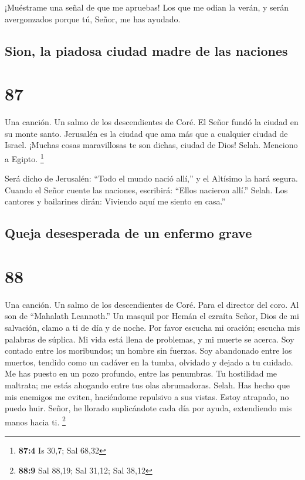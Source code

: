  ¡Muéstrame una señal de que me apruebas! Los que me odian
la verán, y serán avergonzados porque tú, Señor, me has ayudado.

\hypertarget{sion-la-piadosa-ciudad-madre-de-las-naciones}{%
\subsection{Sion, la piadosa ciudad madre de las
naciones}\label{sion-la-piadosa-ciudad-madre-de-las-naciones}}

\hypertarget{section-86}{%
\section{87}\label{section-86}}

Una canción. Un salmo de los descendientes de Coré.  El
Señor fundó la ciudad en su monte santo.  Jerusalén es la
ciudad que ama más que a cualquier ciudad de Israel. 
¡Muchas cosas maravillosas te son dichas, ciudad de Dios! Selah.
 Menciono a Egipto. \footnote{\textbf{87:4} Is 30,7; Sal
  68,32}

 Será dicho de Jerusalén: ``Todo el mundo nació allí,'' y el
Altísimo la hará segura.  Cuando el Señor cuente las
naciones, escribirá: ``Ellos nacieron allí.'' Selah.  Los
cantores y bailarines dirán: Viviendo aquí me siento en casa.''

\hypertarget{queja-desesperada-de-un-enfermo-grave}{%
\subsection{Queja desesperada de un enfermo
grave}\label{queja-desesperada-de-un-enfermo-grave}}

\hypertarget{section-87}{%
\section{88}\label{section-87}}

Una canción. Un salmo de los descendientes de Coré. Para el director del
coro. Al son de ``Mahalath Leannoth.'' Un masquil por Hemán el ezraíta
 Señor, Dios de mi salvación, clamo a ti de día y de noche.
 Por favor escucha mi oración; escucha mis palabras de
súplica.  Mi vida está llena de problemas, y mi muerte se
acerca.  Soy contado entre los moribundos; un hombre sin
fuerzas.  Soy abandonado entre los muertos, tendido como un
cadáver en la tumba, olvidado y dejado a tu cuidado.  Me has
puesto en un pozo profundo, entre las penumbras.  Tu
hostilidad me maltrata; me estás ahogando entre tus olas abrumadoras.
Selah.  Has hecho que mis enemigos me eviten, haciéndome
repulsivo a sus vistas. Estoy atrapado, no puedo huir. 
Señor, he llorado suplicándote cada día por ayuda, extendiendo mis manos
hacia ti. \footnote{\textbf{88:9} Sal 88,19; Sal 31,12; Sal 38,12}

